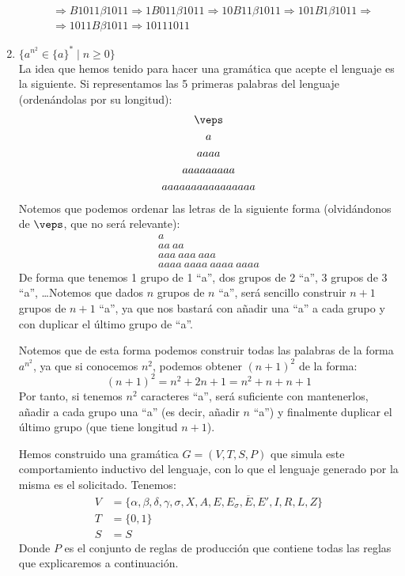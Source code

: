 \begin{ejercicio}
\begin{enumerate}
\begin{align*}
                  &\Rightarrow B1011\beta1011 \Rightarrow 1B011\beta1011 \Rightarrow10B11\beta1011 \Rightarrow 101B1\beta1011\Rightarrow \\
                  &\Rightarrow 1011B\beta1011 \Rightarrow10111011
            \end{align*}
        \item $\{a^{n^2} \in \{a\}^{\ast} \mid n\geq 0\}$\\
            La idea que hemos tenido para hacer una gramática que acepte el lenguaje es la siguiente. Si representamos las 5 primeras palabras del lenguaje (ordenándolas por su longitud):
            \begin{gather*}
                \veps \\
                a \\
                aaaa \\
                aaaaaaaaa \\
                aaaaaaaaaaaaaaaa
            \end{gather*}
            Notemos que podemos ordenar las letras de la siguiente forma (olvidándonos de $\veps$, que no será relevante):
            \begin{gather*}
                a \\
                aa\ aa \\
                aaa\ aaa\ aaa\\
                aaaa\ aaaa\ aaaa\ aaaa 
            \end{gather*}
            De forma que tenemos 1 grupo de 1 ``a'', dos grupos de 2 ``a'', 3 grupos de 3 ``a'', \ldots Notemos que dados $n$ grupos de $n$ ``a'', será sencillo construir $n+1$ grupos de $n+1$ ``a'', ya que nos bastará con añadir una ``a'' a cada grupo y con duplicar el último grupo de ``a''.

            Notemos que de esta forma podemos construir todas las palabras de la forma $a^{n^2}$, ya que si conocemos $n^2$, podemos obtener ${(n+1)}^{2}$ de la forma:
            \begin{equation*}
                {(n+1)}^{2} = n^2 + 2n + 1 = n^2 + n + n + 1
            \end{equation*}
            Por tanto, si tenemos $n^2$ caracteres ``a'', será suficiente con mantenerlos, añadir a cada grupo una ``a'' (es decir, añadir $n$ ``a'') y finalmente duplicar el último grupo (que tiene longitud $n+1$).

            Hemos construido una gramática $G = (V, T, S, P)$ que simula este comportamiento inductivo del lenguaje, con lo que el lenguaje generado por la misma es el solicitado. Tenemos:
            \begin{align*}
                V &= \{\alpha, \beta, \delta, \gamma, \sigma, X, A, E, E_{\sigma}, \overline{E}, E', I, R, L, Z \} \\
                T &= \{0,1\} \\
                S &= S
            \end{align*}
            Donde $P$ es el conjunto de reglas de producción que contiene todas las reglas que explicaremos a continuación.


\end{enumerate}
\end{ejercicio}
